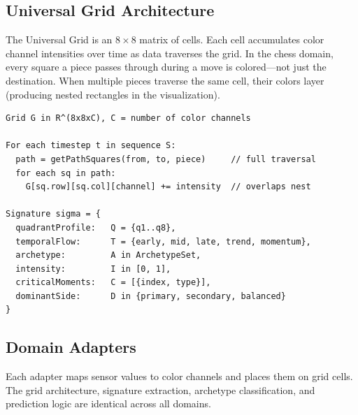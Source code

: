 \documentclass[12pt,a4paper]{article}
\begin{document}
\subsection{Universal Grid Architecture}

The Universal Grid is an $8{\times}8$ matrix of cells. Each cell accumulates color channel
intensities over time as data traverses the grid. In the chess domain, every square a piece passes
through during a move is colored---not just the destination. When multiple pieces traverse the same
cell, their colors layer (producing nested rectangles in the visualization).

\begin{verbatim}
Grid G in R^(8x8xC), C = number of color channels

For each timestep t in sequence S:
  path = getPathSquares(from, to, piece)     // full traversal
  for each sq in path:
    G[sq.row][sq.col][channel] += intensity  // overlaps nest

Signature sigma = {
  quadrantProfile:   Q = {q1..q8},
  temporalFlow:      T = {early, mid, late, trend, momentum},
  archetype:         A in ArchetypeSet,
  intensity:         I in [0, 1],
  criticalMoments:   C = [{index, type}],
  dominantSide:      D in {primary, secondary, balanced}
}
\end{verbatim}

\subsection{Domain Adapters}

Each adapter maps sensor values to color channels and places them on grid cells. The grid
architecture, signature extraction, archetype classification, and prediction logic are identical
across all domains.
\end{document}
